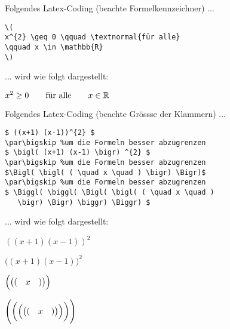 \pagebreak
Folgendes Latex-Coding (beachte Formelkennzeichner) ...

\begin{tcolorbox}[width=\textwidth,colback={light-gray},title={Latex-Text},colbacktitle=gray,coltitle=white]

\begin{verbatim}
\(
x^{2} \geq 0 \qquad \textnormal{für alle} 
\qquad x \in \mathbb{R}
\)
\end{verbatim}

\end{tcolorbox}

... wird wie folgt dargestellt: 

\begin{tcolorbox}[width=\textwidth,colback={light-gray},title={Print-Text},colbacktitle=gray,coltitle=white]

\(
x^{2} \geq 0 \qquad \textnormal{für alle} 
\qquad x \in \mathbb{R}
\)

\end{tcolorbox}


\par\bigskip 
\par\bigskip 
\par\bigskip 
Folgendes Latex-Coding (beachte Grössse der Klammern) ...

\begin{tcolorbox}[width=\textwidth,colback={light-gray},title={Latex-Text},colbacktitle=gray,coltitle=white]

\begin{verbatim}
$ ((x+1) (x-1))^{2} $
\par\bigskip %um die Formeln besser abzugrenzen
$ \bigl( (x+1) (x-1) \bigr) ^{2} $
\par\bigskip %um die Formeln besser abzugrenzen
$\Bigl( \bigl( ( \quad x \quad ) \bigr) \Bigr)$
\par\bigskip %um die Formeln besser abzugrenzen
$ \Biggl( \biggl( \Bigl( \bigl( ( \quad x \quad ) 
   \bigr) \Bigr) \biggr) \Biggr) $
\end{verbatim}

\end{tcolorbox}

... wird wie folgt dargestellt: 

\begin{tcolorbox}[width=\textwidth,colback={light-gray},title={Print-Text},colbacktitle=gray,coltitle=white]

$ ((x+1) (x-1))^{2} $
\par\bigskip %
$ \bigl( (x+1) (x-1) \bigr) ^{2} $
\par\bigskip %
$\Bigl( \bigl( ( \quad x \quad ) \bigr) \Bigr)$
\par\bigskip %
$ \Biggl( \biggl( \Bigl( \bigl( ( \quad x \quad ) 
  \bigr) \Bigr) \biggr) \Biggr) $

\end{tcolorbox}
